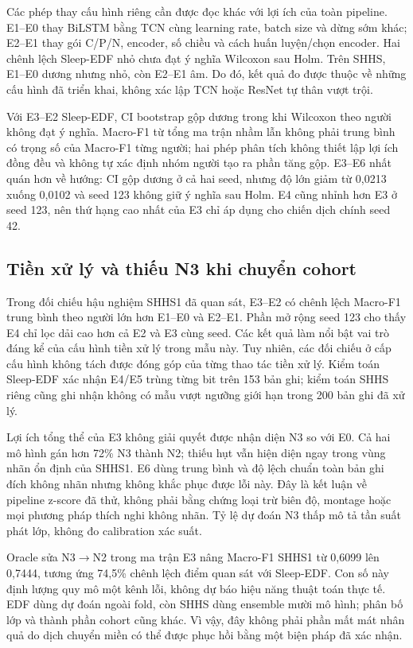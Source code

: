 \documentclass[10pt,a4paper]{article}
\begin{document}
Các phép thay cấu hình riêng cần được đọc khác với lợi ích của toàn pipeline. E1--E0 thay BiLSTM bằng TCN cùng learning rate, batch size và dừng sớm khác; E2--E1 thay gói C/P/N, encoder, số chiều và cách huấn luyện/chọn encoder. Hai chênh lệch Sleep-EDF nhỏ chưa đạt ý nghĩa Wilcoxon sau Holm. Trên SHHS, E1--E0 dương nhưng nhỏ, còn E2--E1 âm. Do đó, kết quả đo được thuộc về những cấu hình đã triển khai, không xác lập TCN hoặc ResNet tự thân vượt trội.

Với E3--E2 Sleep-EDF, CI bootstrap gộp dương trong khi Wilcoxon theo người không đạt ý nghĩa. Macro-F1 từ tổng ma trận nhầm lẫn không phải trung bình có trọng số của Macro-F1 từng người; hai phép phân tích không thiết lập lợi ích đồng đều và không tự xác định nhóm người tạo ra phần tăng gộp. E3--E6 nhất quán hơn về hướng: CI gộp dương ở cả hai seed, nhưng độ lớn giảm từ 0,0213 xuống 0,0102 và seed 123 không giữ ý nghĩa sau Holm. E4 cũng nhỉnh hơn E3 ở seed 123, nên thứ hạng cao nhất của E3 chỉ áp dụng cho chiến dịch chính seed 42.

\subsection{Tiền xử lý và thiếu N3 khi chuyển cohort}

Trong đối chiếu hậu nghiệm SHHS1 đã quan sát, E3--E2 có chênh lệch Macro-F1 trung bình theo người lớn hơn E1--E0 và E2--E1. Phần mở rộng seed 123 cho thấy E4 chỉ lọc dải cao hơn cả E2 và E3 cùng seed. Các kết quả làm nổi bật vai trò đáng kể của cấu hình tiền xử lý trong mẫu này. Tuy nhiên, các đối chiếu ở cấp cấu hình không tách được đóng góp của từng thao tác tiền xử lý. Kiểm toán Sleep-EDF xác nhận E4/E5 trùng từng bit trên 153 bản ghi; kiểm toán SHHS riêng cũng ghi nhận không có mẫu vượt ngưỡng giới hạn trong 200 bản ghi đã xử lý.

Lợi ích tổng thể của E3 không giải quyết được nhận diện N3 so với E0. Cả hai mô hình gán hơn 72\% N3 thành N2; thiếu hụt vẫn hiện diện ngay trong vùng nhãn ổn định của SHHS1. E6 dùng trung bình và độ lệch chuẩn toàn bản ghi đích không nhãn nhưng không khắc phục được lỗi này. Đây là kết luận về pipeline z-score đã thử, không phải bằng chứng loại trừ biên độ, montage hoặc mọi phương pháp thích nghi không nhãn. Tỷ lệ dự đoán N3 thấp mô tả tần suất phát lớp, không đo calibration xác suất.

Oracle sửa N3$\rightarrow$N2 trong ma trận E3 nâng Macro-F1 SHHS1 từ 0,6099 lên 0,7444, tương ứng 74,5\% chênh lệch điểm quan sát với Sleep-EDF. Con số này định lượng quy mô một kênh lỗi, không dự báo hiệu năng thuật toán thực tế. EDF dùng dự đoán ngoài fold, còn SHHS dùng ensemble mười mô hình; phân bố lớp và thành phần cohort cũng khác. Vì vậy, đây không phải phần mất mát nhân quả do dịch chuyển miền có thể được phục hồi bằng một biện pháp đã xác nhận.
\end{document}
